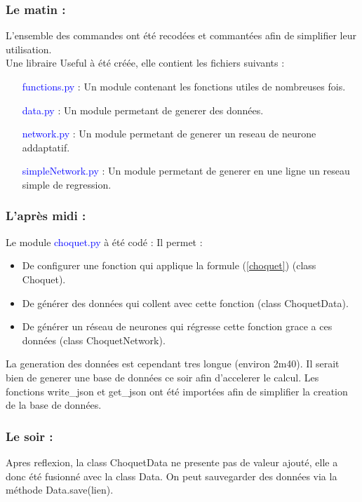 \subsubsection*{Le matin :}
L'ensemble des commandes ont été recodées et commantées afin de simplifier leur utilisation. \\
Une libraire Useful à été créée, elle contient les fichiers suivants :

\begin{itemize}
    \item[\textcolor{blue}{functions.py }:] Un module contenant les fonctions utiles de nombreuses fois.
    \item[\textcolor{blue}{data.py }:] Un module permetant de generer des données.
    \item[\textcolor{blue}{network.py }:] Un module permetant de generer un reseau de neurone addaptatif.
    \item[\textcolor{blue}{simpleNetwork.py }:] Un module permetant de generer en une ligne un reseau simple de regression.
\end{itemize}

\subsubsection*{L'après midi :}
Le module \textcolor{blue}{choquet.py} à été codé :
Il permet :
\begin{itemize}
    \item De configurer une fonction qui applique la formule (\ref{choquet}) (class Choquet).
    \item De générer des données qui collent avec cette fonction (class ChoquetData).
    \item De générer un réseau de neurones qui régresse cette fonction grace a ces données (class ChoquetNetwork).
\end{itemize}

La generation des données est cependant tres longue (environ 2m40).
Il serait bien de generer une base de données ce soir afin d'accelerer le calcul.
Les fonctions write_json et get_json ont été importées afin de simplifier la creation de la base de données.

\subsubsection*{Le soir :}
Apres reflexion, la class ChoquetData ne presente pas de valeur ajouté, elle a donc été fusionné avec la class Data.
On peut sauvegarder des données via la méthode Data.save(lien).

